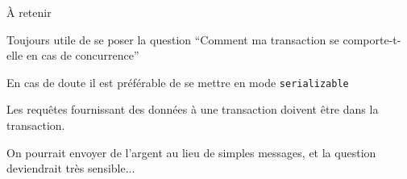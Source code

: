\begin{frame}{À retenir}

Toujours utile de se poser la question ``Comment ma transaction se comporte-t-elle
en cas de concurrence''
\vfill

\begin{redbullet}
  \item En cas de doute il est préférable de se mettre en mode \texttt{serializable}
  \item Les requêtes fournissant des données à une transaction doivent être \alert{dans} 
        la transaction.
\end{redbullet}

\vfill

\begin{blocgauche}
On pourrait envoyer de l'argent au lieu de simples messages, et la
question deviendrait très sensible...

\end{blocgauche}
\end{frame}


